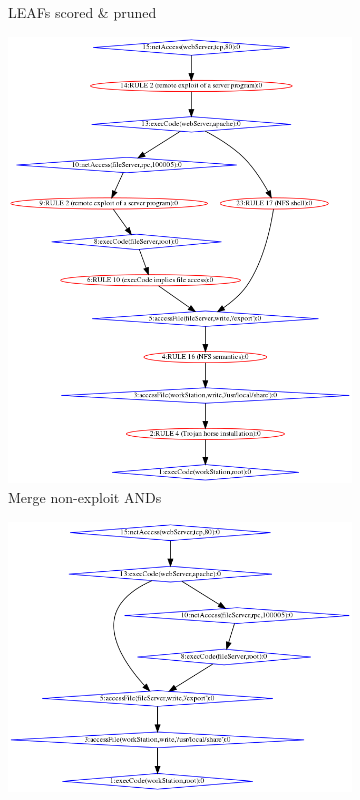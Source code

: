 \begin{figure}
\begin{subfigure}[t]{0.3\textwidth}
        \caption{LEAFs scored \& pruned} 
        \label{fig:tg_002}
    \end{subfigure}
          \begin{subfigure}[t]{0.3\textwidth}
        \centering
        \includegraphics[width=\linewidth]{resource/img/ch_background/sdn_analytics/tmatrix_graphs/nameMe_003_coalesceANDs.png} 
        \caption{Merge non-exploit ANDs}
        \label{fig:tg_003}
    \end{subfigure}
     \begin{subfigure}[t]{0.3\textwidth}
        \centering
        \includegraphics[width=\linewidth]{resource/img/ch_background/sdn_analytics/tmatrix_graphs/nameMe_004_scoreANDs.png} 

\end{subfigure}
\end{figure}

